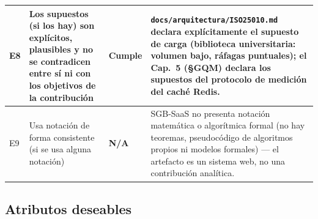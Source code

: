\begin{center}
\begin{longtable}{|p{0.7cm}|p{4.2cm}|p{1.6cm}|p{7.0cm}|}
\hline
E8 & Los supuestos (si los hay) son explícitos, plausibles y no se contradicen entre sí ni con los objetivos de la contribución & \textbf{Cumple} & \texttt{docs/arquitectura/ISO25010.md} declara explícitamente el supuesto de carga (biblioteca universitaria: volumen bajo, ráfagas puntuales); el Cap.\ 5 (§GQM) declara los supuestos del protocolo de medición del caché Redis. \\
\hline
E9 & Usa notación de forma consistente (si se usa alguna notación) & \textbf{N/A} & SGB-SaaS no presenta notación matemática o algorítmica formal (no hay teoremas, pseudocódigo de algoritmos propios ni modelos formales) --- el artefacto es un sistema web, no una contribución analítica. \\
\hline
\end{longtable}
\end{center}

\subsection{Atributos deseables}

